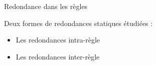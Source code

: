 \begin{frame}{Redondance dans les règles}

    Deux formes de redondances statiques étudiées :

    \begin{itemize}
        \item Les redondances intra-règle 
        \item Les redondances inter-règle 
    \end{itemize}
    
   
\end{frame}

